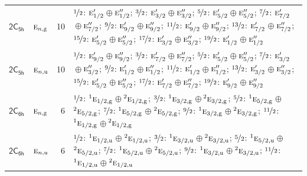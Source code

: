 \documentclass[10pt,a4paper]{article}
\numberwithin{equation}{section}
\newcommand{\grp}[1]{\mathsf{#1}}
\newcommand{\irr}[1]{\text{\normalfont\scshape #1}}
\newcommand{\conjpair}[1]{{}^{#1}}
\newcommand{\ptag}[1]{\mathrm{#1}}
\newlength{\fillwidth}\newlength{\cellwidth}\newlength{\colwidth}
\begin{document}
{\begin{longtable}{@{}llr>{\RaggedRight\arraybackslash}p{\fillwidth}@{}}
\href{2C5h.pdf}{$\grp{2C_{5h}}$} & $\irr{e}_{n,\ptag{g}}$ & 10 & $\nicefrac{1}{2}$: $\irr{e}_{1/2}'$${}\oplus{}$$\irr{e}_{1/2}''$; $\nicefrac{3}{2}$: $\irr{e}_{3/2}'$${}\oplus{}$$\irr{e}_{3/2}''$; $\nicefrac{5}{2}$: $\irr{e}_{5/2}'$${}\oplus{}$$\irr{e}_{5/2}''$; $\nicefrac{7}{2}$: $\irr{e}_{7/2}'$${}\oplus{}$$\irr{e}_{7/2}''$; $\nicefrac{9}{2}$: $\irr{e}_{9/2}'$${}\oplus{}$$\irr{e}_{9/2}''$; $\nicefrac{11}{2}$: $\irr{e}_{9/2}'$${}\oplus{}$$\irr{e}_{9/2}''$; $\nicefrac{13}{2}$: $\irr{e}_{7/2}'$${}\oplus{}$$\irr{e}_{7/2}''$; $\nicefrac{15}{2}$: $\irr{e}_{5/2}'$${}\oplus{}$$\irr{e}_{5/2}''$; $\nicefrac{17}{2}$: $\irr{e}_{3/2}'$${}\oplus{}$$\irr{e}_{3/2}''$; $\nicefrac{19}{2}$: $\irr{e}_{1/2}'$${}\oplus{}$$\irr{e}_{1/2}''$\\
\href{2C5h.pdf}{$\grp{2C_{5h}}$} & $\irr{e}_{n,\ptag{u}}$ & 10 & $\nicefrac{1}{2}$: $\irr{e}_{9/2}'$${}\oplus{}$$\irr{e}_{9/2}''$; $\nicefrac{3}{2}$: $\irr{e}_{7/2}'$${}\oplus{}$$\irr{e}_{7/2}''$; $\nicefrac{5}{2}$: $\irr{e}_{5/2}'$${}\oplus{}$$\irr{e}_{5/2}''$; $\nicefrac{7}{2}$: $\irr{e}_{3/2}'$${}\oplus{}$$\irr{e}_{3/2}''$; $\nicefrac{9}{2}$: $\irr{e}_{1/2}'$${}\oplus{}$$\irr{e}_{1/2}''$; $\nicefrac{11}{2}$: $\irr{e}_{1/2}'$${}\oplus{}$$\irr{e}_{1/2}''$; $\nicefrac{13}{2}$: $\irr{e}_{3/2}'$${}\oplus{}$$\irr{e}_{3/2}''$; $\nicefrac{15}{2}$: $\irr{e}_{5/2}'$${}\oplus{}$$\irr{e}_{5/2}''$; $\nicefrac{17}{2}$: $\irr{e}_{7/2}'$${}\oplus{}$$\irr{e}_{7/2}''$; $\nicefrac{19}{2}$: $\irr{e}_{9/2}'$${}\oplus{}$$\irr{e}_{9/2}''$\\
\href{2C6h.pdf}{$\grp{2C_{6h}}$} & $\irr{e}_{n,\ptag{g}}$ & 6 & $\nicefrac{1}{2}$: $\conjpair{1}\irr{e}_{1/2,\ptag{g}}$${}\oplus{}$$\conjpair{2}\irr{e}_{1/2,\ptag{g}}$; $\nicefrac{3}{2}$: $\conjpair{1}\irr{e}_{3/2,\ptag{g}}$${}\oplus{}$$\conjpair{2}\irr{e}_{3/2,\ptag{g}}$; $\nicefrac{5}{2}$: $\conjpair{1}\irr{e}_{5/2,\ptag{g}}$${}\oplus{}$$\conjpair{2}\irr{e}_{5/2,\ptag{g}}$; $\nicefrac{7}{2}$: $\conjpair{1}\irr{e}_{5/2,\ptag{g}}$${}\oplus{}$$\conjpair{2}\irr{e}_{5/2,\ptag{g}}$; $\nicefrac{9}{2}$: $\conjpair{1}\irr{e}_{3/2,\ptag{g}}$${}\oplus{}$$\conjpair{2}\irr{e}_{3/2,\ptag{g}}$; $\nicefrac{11}{2}$: $\conjpair{1}\irr{e}_{1/2,\ptag{g}}$${}\oplus{}$$\conjpair{2}\irr{e}_{1/2,\ptag{g}}$\\
\href{2C6h.pdf}{$\grp{2C_{6h}}$} & $\irr{e}_{n,\ptag{u}}$ & 6 & $\nicefrac{1}{2}$: $\conjpair{1}\irr{e}_{1/2,\ptag{u}}$${}\oplus{}$$\conjpair{2}\irr{e}_{1/2,\ptag{u}}$; $\nicefrac{3}{2}$: $\conjpair{1}\irr{e}_{3/2,\ptag{u}}$${}\oplus{}$$\conjpair{2}\irr{e}_{3/2,\ptag{u}}$; $\nicefrac{5}{2}$: $\conjpair{1}\irr{e}_{5/2,\ptag{u}}$${}\oplus{}$$\conjpair{2}\irr{e}_{5/2,\ptag{u}}$; $\nicefrac{7}{2}$: $\conjpair{1}\irr{e}_{5/2,\ptag{u}}$${}\oplus{}$$\conjpair{2}\irr{e}_{5/2,\ptag{u}}$; $\nicefrac{9}{2}$: $\conjpair{1}\irr{e}_{3/2,\ptag{u}}$${}\oplus{}$$\conjpair{2}\irr{e}_{3/2,\ptag{u}}$; $\nicefrac{11}{2}$: $\conjpair{1}\irr{e}_{1/2,\ptag{u}}$${}\oplus{}$$\conjpair{2}\irr{e}_{1/2,\ptag{u}}$\\

\end{longtable}}
\end{document}
